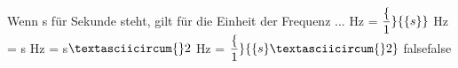     {Wenn s für Sekunde steht, gilt für die Einheit der Frequenz ...}
    {Hz = $\dfrac\{1\}\{\textrm\{s\}\}$}
    {Hz = s}
    {Hz = s$\textasciicircum{}2$}
    {Hz = $\dfrac\{1\}\{\textrm\{s\}\textasciicircum{}2\}$}
    {false}{false}